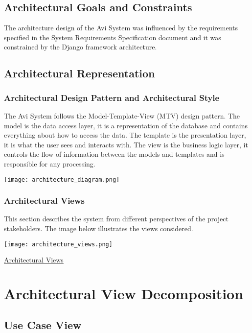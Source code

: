 \documentclass[10pt]{article}
\begin{document}
\subsection{Architectural Goals and Constraints}

The architecture design of the Avi System was influenced by the requirements specified in the System Requirements Specification document and it was constrained by the Django framework architecture.

\subsection{Architectural Representation}


\subsubsection{Architectural Design Pattern and Architectural Style}

The Avi System follows the Model-Template-View (MTV) design pattern. The model is the data access layer, it is a representation of the database and contains everything about how to access the data.  The template is the presentation layer, it is what the user sees and interacts with. The view is the business logic layer, it controls the flow of information between the models and templates and is responsible for any processing.

\begin{center}
\texttt{[image: architecture\_diagram.png]}
\end{center}


\newpage

\subsubsection{Architectural Views}
This section describes the system from different perspectives of the project stakeholders. The image below illustrates the views considered.
\begin{center}
\texttt{[image: architecture\_views.png]}
\end{center}
\caption{\underline{Architectural Views}}

\section{Architectural View Decomposition}

\subsection{Use Case View}
\end{document}
